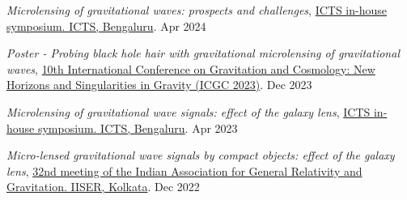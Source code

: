 \begin{itemize}[noitemsep]
{
\item \textit{Microlensing of gravitational waves: prospects and challenges}, \href{https://www.icts.res.in/inhouse2024}{ICTS in-house symposium. ICTS, Bengaluru}. \hfill{Apr 2024}
\item \textit{Poster - Probing black hole hair with gravitational microlensing of gravitational waves}, \href{https://indico.cern.ch/event/1268737/registrations/participants}{10th International Conference on Gravitation and Cosmology: New Horizons and Singularities in Gravity (ICGC 2023)}. \hfill{Dec 2023}
\item \textit{Microlensing of gravitational wave signals: effect of the galaxy lens}, \href{https://www.icts.res.in/inhouse2023}{ICTS in-house symposium. ICTS, Bengaluru}. \hfill{Apr 2023}
\item \textit{Micro-lensed gravitational wave signals by compact objects: effect of the galaxy lens}, \href{https://www.iiserkol.ac.in/~iagrg32/}{32nd meeting of the Indian Association for General Relativity and Gravitation. IISER, Kolkata}. \hfill{Dec 2022}

}\end{itemize}
